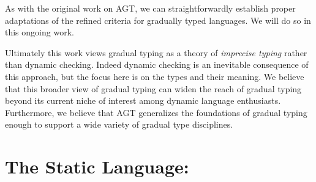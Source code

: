 \documentclass[authoryear,sort&compress,9pt,twocolumn,nocopyrightspace]{sigplanconf}
\newcommand{\lsec}{\xspace}
\newcommand{\?}{\textsf{\upshape ?}} \newcommand{\consistent}[1]{\widetilde{#1}}
\begin{document}
As with the original work on AGT, we can straightforwardly establish proper
adaptations of the refined criteria for gradually typed languages.  We will do
so in this ongoing work.

Ultimately this work views gradual typing as a theory of \emph{imprecise
  typing} rather than dynamic checking.  Indeed dynamic checking is an
inevitable consequence of this approach, but the focus here is on the types and
their meaning.  We believe that this broader view of gradual typing can widen
the reach of gradual typing beyond its current niche of interest among
dynamic language enthusiasts.  Furthermore, we believe that AGT generalizes the
foundations of gradual typing enough to support a wide variety of
gradual type disciplines.



\section{The Static Language: \lsec}
\end{document}

